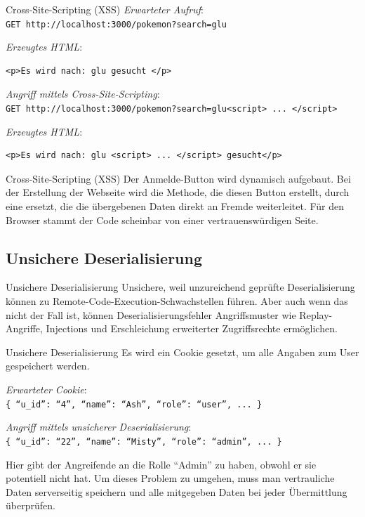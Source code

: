 \begin{example}{Cross-Site-Scripting (XSS)}
    \emph{Erwarteter Aufruf}: \\
    \texttt{GET http://localhost:3000/pokemon?search=glu}

    \emph{Erzeugtes HTML}:
    \begin{lstlisting}[language=HTML5]
        <p>Es wird nach: glu gesucht </p>
    \end{lstlisting}

    \emph{Angriff mittels Cross-Site-Scripting}: \\
    \texttt{GET http://localhost:3000/pokemon?search=glu<script> ... </script>}

    \emph{Erzeugtes HTML}:
    \begin{lstlisting}[language=HTML5]
        <p>Es wird nach: glu <script> ... </script> gesucht</p>
    \end{lstlisting}
\end{example}

\begin{example}{Cross-Site-Scripting (XSS)}
    Der Anmelde-Button wird dynamisch aufgebaut.
    Bei der Erstellung der Webseite wird die Methode, die diesen Button erstellt, durch eine ersetzt, die die übergebenen Daten direkt an Fremde weiterleitet.
    Für den Browser stammt der Code scheinbar von einer vertrauenswürdigen Seite.
\end{example}

\subsection{Unsichere Deserialisierung}

\begin{defi}{Unsichere Deserialisierung}
    Unsichere, weil unzureichend geprüfte Deserialisierung können zu Remote-Code-Execution-Schwachstellen führen.
    Aber auch wenn das nicht der Fall ist, können Deserialisierungsfehler Angriffsmuster wie Replay-Angriffe, Injections und Erschleichung erweiterter Zugriffsrechte ermöglichen.
\end{defi}

\begin{example}{Unsichere Deserialisierung}
    Es wird ein Cookie gesetzt, um alle Angaben zum User gespeichert werden.

    \emph{Erwarteter Cookie}: \\
    \texttt{\{ \enquote{u\_id}: \enquote{4}, \enquote{name}: \enquote{Ash}, \enquote{role}: \enquote{user}, ... \}}

    \emph{Angriff mittels unsicherer Deserialisierung}: \\
    \texttt{\{ \enquote{u\_id}: \enquote{22}, \enquote{name}: \enquote{Misty}, \enquote{role}: \enquote{\hl{admin}}, ... \}}

    Hier gibt der Angreifende an die Rolle \enquote{Admin} zu haben, obwohl er sie potentiell nicht hat.
    Um dieses Problem zu umgehen, muss man vertrauliche Daten serverseitig speichern und alle mitgegeben Daten bei jeder Übermittlung überprüfen.
\end{example}

